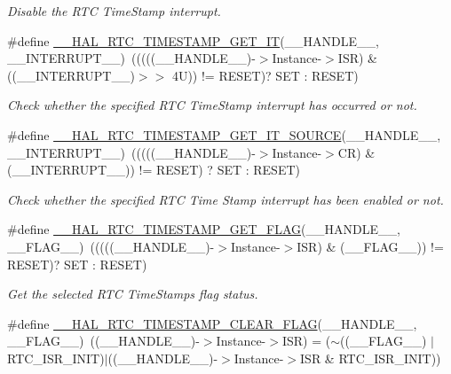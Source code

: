 \begin{DoxyCompactItemize}
\begin{DoxyCompactList}\small\item\em Disable the R\+TC Time\+Stamp interrupt. \end{DoxyCompactList}\item 
\#define \hyperlink{group___r_t_c_ex___timestamp_gaaf023d7dd4c3068e8297187f2cc6b16e}{\+\_\+\+\_\+\+H\+A\+L\+\_\+\+R\+T\+C\+\_\+\+T\+I\+M\+E\+S\+T\+A\+M\+P\+\_\+\+G\+E\+T\+\_\+\+IT}(\+\_\+\+\_\+\+H\+A\+N\+D\+L\+E\+\_\+\+\_\+,  \+\_\+\+\_\+\+I\+N\+T\+E\+R\+R\+U\+P\+T\+\_\+\+\_\+)~(((((\+\_\+\+\_\+\+H\+A\+N\+D\+L\+E\+\_\+\+\_\+)-\/$>$Instance-\/$>$I\+SR) \& ((\+\_\+\+\_\+\+I\+N\+T\+E\+R\+R\+U\+P\+T\+\_\+\+\_\+)$>$$>$ 4\+U)) != R\+E\+S\+E\+T)? S\+E\+T \+: R\+E\+S\+E\+T)
\begin{DoxyCompactList}\small\item\em Check whether the specified R\+TC Time\+Stamp interrupt has occurred or not. \end{DoxyCompactList}\item 
\#define \hyperlink{group___r_t_c_ex___timestamp_ga54100a14a01e1ebe8af226385d12ee57}{\+\_\+\+\_\+\+H\+A\+L\+\_\+\+R\+T\+C\+\_\+\+T\+I\+M\+E\+S\+T\+A\+M\+P\+\_\+\+G\+E\+T\+\_\+\+I\+T\+\_\+\+S\+O\+U\+R\+CE}(\+\_\+\+\_\+\+H\+A\+N\+D\+L\+E\+\_\+\+\_\+,  \+\_\+\+\_\+\+I\+N\+T\+E\+R\+R\+U\+P\+T\+\_\+\+\_\+)~(((((\+\_\+\+\_\+\+H\+A\+N\+D\+L\+E\+\_\+\+\_\+)-\/$>$Instance-\/$>$CR) \& (\+\_\+\+\_\+\+I\+N\+T\+E\+R\+R\+U\+P\+T\+\_\+\+\_\+)) != R\+E\+S\+ET) ? S\+ET \+: R\+E\+S\+ET)
\begin{DoxyCompactList}\small\item\em Check whether the specified R\+TC Time Stamp interrupt has been enabled or not. \end{DoxyCompactList}\item 
\#define \hyperlink{group___r_t_c_ex___timestamp_ga72799940c34e70df0d33eca772794813}{\+\_\+\+\_\+\+H\+A\+L\+\_\+\+R\+T\+C\+\_\+\+T\+I\+M\+E\+S\+T\+A\+M\+P\+\_\+\+G\+E\+T\+\_\+\+F\+L\+AG}(\+\_\+\+\_\+\+H\+A\+N\+D\+L\+E\+\_\+\+\_\+,  \+\_\+\+\_\+\+F\+L\+A\+G\+\_\+\+\_\+)~(((((\+\_\+\+\_\+\+H\+A\+N\+D\+L\+E\+\_\+\+\_\+)-\/$>$Instance-\/$>$I\+SR) \& (\+\_\+\+\_\+\+F\+L\+A\+G\+\_\+\+\_\+)) != R\+E\+S\+ET)? S\+ET \+: R\+E\+S\+ET)
\begin{DoxyCompactList}\small\item\em Get the selected R\+TC Time\+Stamp\textquotesingle{}s flag status. \end{DoxyCompactList}\item 
\#define \hyperlink{group___r_t_c_ex___timestamp_gac9d386e61a572b0c9d0e58a04e1819ef}{\+\_\+\+\_\+\+H\+A\+L\+\_\+\+R\+T\+C\+\_\+\+T\+I\+M\+E\+S\+T\+A\+M\+P\+\_\+\+C\+L\+E\+A\+R\+\_\+\+F\+L\+AG}(\+\_\+\+\_\+\+H\+A\+N\+D\+L\+E\+\_\+\+\_\+,  \+\_\+\+\_\+\+F\+L\+A\+G\+\_\+\+\_\+)~((\+\_\+\+\_\+\+H\+A\+N\+D\+L\+E\+\_\+\+\_\+)-\/$>$Instance-\/$>$I\+SR) = ($\sim$((\+\_\+\+\_\+\+F\+L\+A\+G\+\_\+\+\_\+) $\vert$ R\+T\+C\+\_\+\+I\+S\+R\+\_\+\+I\+N\+IT)$\vert$((\+\_\+\+\_\+\+H\+A\+N\+D\+L\+E\+\_\+\+\_\+)-\/$>$Instance-\/$>$I\+SR \& R\+T\+C\+\_\+\+I\+S\+R\+\_\+\+I\+N\+IT))
$$
\end{DoxyCompactItemize}
